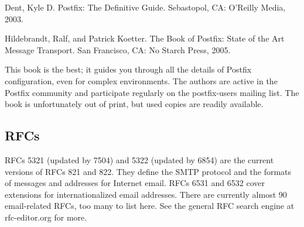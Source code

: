 {Dent, Kyle D}. {Postfix: The Definitive Guide}. Sebastopol, CA:
O'Reilly Media, 2003.

{Hildebrandt, Ralf, and Patrick Koetter. }{The Book of Postfix: State of
the Art Message Transport.} San Francisco, CA: No Starch Press, 2005.

This book is the best; it guides you through all the details of Postfix
configuration, even for complex environments. The authors are active in
the Postfix community and participate regularly on the postfix-users
mailing list. The book is unfortunately out of print, but used copies
are readily available.

\protect\hypertarget{part0026_split_069.html}{}{}

\hypertarget{part0026_split_069.htmlux5cux23_idContainer1247}{}
\hypertarget{part0026_split_069.htmlux5cux23calibre_pb_68}{%
\subsection[RFCs]{\texorpdfstring{\protect\hypertarget{part0026_split_069.htmlux5cux23_idTextAnchor1206}{}{}RFCs}{RFCs}}\label{part0026_split_069.htmlux5cux23calibre_pb_68}}

RFCs 5321 (updated by 7504) and 5322 (updated by 6854) are the current
versions of RFCs 821 and 822. They define the SMTP protocol and the
formats of messages and addresses for Internet email. RFCs 6531 and 6532
cover extensions for internationalized email addresses. There are
currently almost 90 email-related RFCs, too many to list here. See the
general RFC search engine at rfc-editor.org for more.
